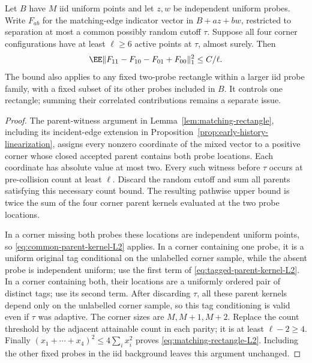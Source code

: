 \documentclass[11pt,letterpaper]{article}
\begin{document}
\begin{proposition}
\label{prop:matching-rectangle-L2}
Let $B$ have $M$ iid uniform points and let $z,w$ be independent
uniform probes. Write $F_{ab}$ for the matching-edge indicator
vector in $B+az+bw$, restricted to separation at most a common
possibly random cutoff $\tau$. Suppose all four corner
configurations have at least $\ell\ge6$ active points at
$\tau$, almost surely. Then
\begin{equation}\label{eq:matching-rectangle-L2}
 \EE\|F_{11}-F_{10}-F_{01}+F_{00}\|_1^2
       \le C/\ell.
\end{equation}
The bound also applies to any fixed two-probe rectangle within
a larger iid probe family, with a fixed subset of its other
probes included in $B$. It controls one rectangle; summing
their correlated contributions remains a separate issue.
\end{proposition}
\begin{proof}
The parent-witness argument in
Lemma~\ref{lem:matching-rectangle}, including its incident-edge
extension in Proposition~\ref{prop:early-history-linearization},
assigns every nonzero coordinate of the mixed vector to a
positive corner whose closed accepted parent contains both
probe locations. Each coordinate has absolute value at most
two. Every such witness before $\tau$ occurs at pre-collision
count at least $\ell$. Discard the random cutoff and sum all
parents satisfying this necessary count bound. The resulting
pathwise upper bound is twice the sum of the four corner
parent kernels evaluated at the two probe locations.

In a corner missing both probes these locations are independent
uniform points, so \eqref{eq:common-parent-kernel-L2} applies.
In a corner containing one probe, it is a uniform original tag
conditional on the unlabelled corner sample, while the absent
probe is independent uniform; use the first term of
\eqref{eq:tagged-parent-kernel-L2}. In a corner containing
both, their locations are a uniformly ordered pair of distinct
tags; use its second term. After discarding $\tau$, all these
parent kernels depend only on the unlabelled corner sample,
so this tag conditioning is valid even if $\tau$ was adaptive.
The corner sizes are $M,M+1,M+2$.
Replace the count threshold by the adjacent attainable count
in each parity; it is at least $\ell-2\ge4$.
Finally $(x_1+\cdots+x_4)^2\le4\sum_i x_i^2$ proves
\eqref{eq:matching-rectangle-L2}. Including the other fixed
probes in the iid background leaves this argument unchanged.
\end{proof}
\end{document}
